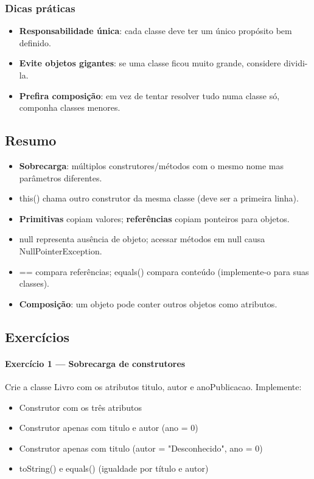 \documentclass[11pt,a4paper]{article}
\renewcommand{\texttt}[1]{{\color{javaCodeInline}\small\ttfamily #1}}
\begin{document}
\subsubsection{Dicas práticas}

\begin{itemize}
\item \textbf{Responsabilidade única}: cada classe deve ter um único propósito bem definido.
\item \textbf{Evite objetos gigantes}: se uma classe ficou muito grande, considere dividi-la.
\item \textbf{Prefira composição}: em vez de tentar resolver tudo numa classe só, componha classes menores.
\end{itemize}

\subsection{Resumo}

\begin{itemize}
\item \textbf{Sobrecarga}: múltiplos construtores/métodos com o mesmo nome mas parâmetros diferentes.
\item \texttt{this()} chama outro construtor da mesma classe (deve ser a primeira linha).
\item \textbf{Primitivas} copiam valores; \textbf{referências} copiam ponteiros para objetos.
\item \texttt{null} representa ausência de objeto; acessar métodos em \texttt{null} causa \texttt{NullPointerException}.
\item \texttt{==} compara referências; \texttt{equals()} compara conteúdo (implemente-o para suas classes).
\item \textbf{Composição}: um objeto pode conter outros objetos como atributos.
\end{itemize}

\subsection{Exercícios}

\paragraph{Exercício 1 --- Sobrecarga de construtores}

Crie a classe \texttt{Livro} com os atributos \texttt{titulo}, \texttt{autor} e \texttt{anoPublicacao}. Implemente:
\begin{itemize}
\item Construtor com os três atributos
\item Construtor apenas com \texttt{titulo} e \texttt{autor} (ano = 0)
\item Construtor apenas com \texttt{titulo} (autor = "Desconhecido", ano = 0)
\item \texttt{toString()} e \texttt{equals()} (igualdade por título e autor)
\end{itemize}
\end{document}
